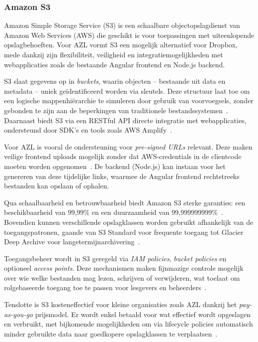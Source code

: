 \subsubsection{Amazon S3}
Amazon Simple Storage Service (S3) is een schaalbare objectopslagdienst van Amazon Web Services (AWS) die geschikt is voor toepassingen met uiteenlopende opslagbehoeften. Voor AZL vormt S3 een mogelijk alternatief voor Dropbox, mede dankzij zijn flexibiliteit, veiligheid en integratiemogelijkheden met webapplicaties zoals de bestaande Angular frontend en Node.js backend.

S3 slaat gegevens op in \textit{buckets}, waarin objecten – bestaande uit data en metadata – uniek geïdentificeerd worden via sleutels. Deze structuur laat toe om een logische mappenhiërarchie te simuleren door gebruik van voorvoegsels, zonder gebonden te zijn aan de beperkingen van traditionele bestandssystemen~\cite{aws_docs_structuur}. Daarnaast biedt S3 via een RESTful API directe integratie met webapplicaties, ondersteund door SDK's en tools zoals AWS Amplify~\cite{aws_docs_amplify}.

Voor AZL is vooral de ondersteuning voor \textit{pre-signed URLs} relevant. Deze maken veilige frontend uploads mogelijk zonder dat AWS-credentials in de clientcode moeten worden opgenomen~\cite{aws_presigned}. De backend (Node.js) kan instaan voor het genereren van deze tijdelijke links, waarmee de Angular frontend rechtstreeks bestanden kan opslaan of ophalen.

Qua schaalbaarheid en betrouwbaarheid biedt Amazon S3 sterke garanties: een beschikbaarheid van 99,99\% en een duurzaamheid van 99,999999999\%~\cite{aws_availability}. Bovendien kunnen verschillende opslagklassen worden gebruikt afhankelijk van de toegangspatronen, gaande van S3 Standard voor frequente toegang tot Glacier Deep Archive voor langetermijnarchivering~\cite{aws_classes}.

Toegangsbeheer wordt in S3 geregeld via \textit{IAM policies}, \textit{bucket policies} en optioneel \textit{access points}. Deze mechanismen maken fijnmazige controle mogelijk over wie welke bestanden mag lezen, schrijven of verwijderen, wat toelaat om rolgebaseerde toegang toe te passen voor lesgevers en beheerders~\cite{aws_accesscontrol}.

Tenslotte is S3 kosteneffectief voor kleine organisaties zoals AZL dankzij het \textit{pay-as-you-go} prijsmodel. Er wordt enkel betaald voor wat effectief wordt opgeslagen en verbruikt, met bijkomende mogelijkheden om via lifecycle policies automatisch minder gebruikte data naar goedkopere opslagklassen te verplaatsen~\cite{aws_costs}.

